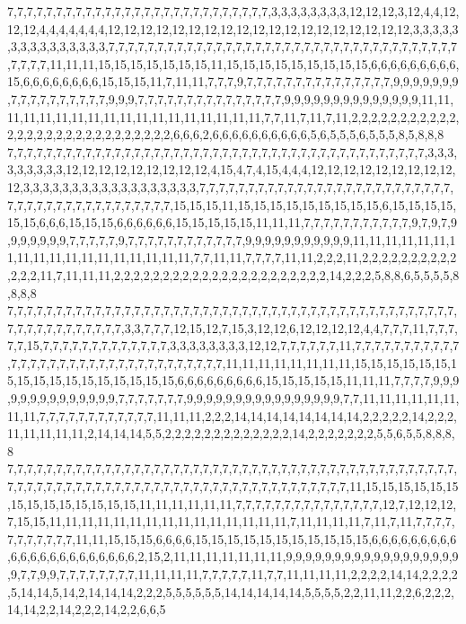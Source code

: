 7,7,7,7,7,7,7,7,7,7,7,7,7,7,7,7,7,7,7,7,7,7,7,7,7,7,7,3,3,3,3,3,3,3,3,12,12,12,3,12,4,4,12,12,12,4,4,4,4,4,4,4,12,12,12,12,12,12,12,12,12,12,12,12,12,12,12,12,12,12,12,3,3,3,3,3,3,3,3,3,3,3,3,3,3,3,7,7,7,7,7,7,7,7,7,7,7,7,7,7,7,7,7,7,7,7,7,7,7,7,7,7,7,7,7,7,7,7,7,7,7,7,7,7,7,7,11,11,11,15,15,15,15,15,15,15,11,15,15,15,15,15,15,15,15,15,6,6,6,6,6,6,6,6,6,15,6,6,6,6,6,6,6,6,15,15,15,11,7,11,11,7,7,7,9,7,7,7,7,7,7,7,7,7,7,7,7,7,7,7,9,9,9,9,9,9,9,7,7,7,7,7,7,7,7,7,7,9,9,9,7,7,7,7,7,7,7,7,7,7,7,7,7,7,7,9,9,9,9,9,9,9,9,9,9,9,9,9,9,11,11,11,11,11,11,11,11,11,11,11,11,11,11,11,11,11,11,7,7,11,7,11,7,11,2,2,2,2,2,2,2,2,2,2,2,2,2,2,2,2,2,2,2,2,2,2,2,2,2,2,2,2,6,6,6,2,6,6,6,6,6,6,6,6,6,6,5,6,5,5,5,6,5,5,5,8,5,8,8,8
7,7,7,7,7,7,7,7,7,7,7,7,7,7,7,7,7,7,7,7,7,7,7,7,7,7,7,7,7,7,7,7,7,7,7,7,7,7,7,7,7,7,7,3,3,3,3,3,3,3,3,3,12,12,12,12,12,12,12,12,12,4,15,4,7,4,15,4,4,4,12,12,12,12,12,12,12,12,12,12,3,3,3,3,3,3,3,3,3,3,3,3,3,3,3,3,3,3,7,7,7,7,7,7,7,7,7,7,7,7,7,7,7,7,7,7,7,7,7,7,7,7,7,7,7,7,7,7,7,7,7,7,7,7,7,7,7,7,7,7,7,15,15,15,11,15,15,15,15,15,15,15,15,15,6,15,15,15,15,15,15,6,6,6,15,15,15,6,6,6,6,6,6,15,15,15,15,15,11,11,11,7,7,7,7,7,7,7,7,7,7,7,9,7,9,7,9,9,9,9,9,9,9,7,7,7,7,7,9,7,7,7,7,7,7,7,7,7,7,7,7,9,9,9,9,9,9,9,9,9,9,9,11,11,11,11,11,11,11,11,11,11,11,11,11,11,11,11,11,11,7,7,11,11,7,7,7,7,11,11,2,2,2,11,2,2,2,2,2,2,2,2,2,2,2,2,2,11,7,11,11,11,2,2,2,2,2,2,2,2,2,2,2,2,2,2,2,2,2,2,2,2,2,2,14,2,2,2,5,8,8,6,5,5,5,5,8,8,8,8
7,7,7,7,7,7,7,7,7,7,7,7,7,7,7,7,7,7,7,7,7,7,7,7,7,7,7,7,7,7,7,7,7,7,7,7,7,7,7,7,7,7,7,7,7,7,7,7,7,7,7,7,7,7,7,7,7,7,3,3,7,7,7,12,15,12,7,15,3,12,12,6,12,12,12,12,4,4,7,7,7,11,7,7,7,7,7,15,7,7,7,7,7,7,7,7,7,7,7,7,7,3,3,3,3,3,3,3,3,12,12,7,7,7,7,7,7,11,7,7,7,7,7,7,7,7,7,7,7,7,7,7,7,7,7,7,7,7,7,7,7,7,7,7,7,7,7,7,7,7,7,11,11,11,11,11,11,11,11,15,15,15,15,15,15,15,15,15,15,15,15,15,15,15,15,15,6,6,6,6,6,6,6,6,6,15,15,15,15,15,11,11,11,7,7,7,7,9,9,9,9,9,9,9,9,9,9,9,9,9,9,7,7,7,7,7,7,7,9,9,9,9,9,9,9,9,9,9,9,9,9,9,9,9,7,7,11,11,11,11,11,11,11,11,7,7,7,7,7,7,7,7,7,7,7,7,11,11,11,2,2,2,14,14,14,14,14,14,14,14,2,2,2,2,2,14,2,2,2,11,11,11,11,11,2,14,14,14,5,5,2,2,2,2,2,2,2,2,2,2,2,2,2,14,2,2,2,2,2,2,2,5,5,6,5,5,8,8,8,8
7,7,7,7,7,7,7,7,7,7,7,7,7,7,7,7,7,7,7,7,7,7,7,7,7,7,7,7,7,7,7,7,7,7,7,7,7,7,7,7,7,7,7,7,7,7,7,7,7,7,7,7,7,7,7,7,7,7,7,7,7,7,7,7,7,7,7,7,7,7,7,7,7,7,7,7,7,7,7,7,7,11,15,15,15,15,15,15,15,15,15,15,15,15,15,15,11,11,11,11,11,11,7,7,7,7,7,7,7,7,7,7,7,7,7,7,7,12,7,12,12,12,7,15,15,11,11,11,11,11,11,11,11,11,11,11,11,11,11,11,7,11,11,11,11,7,11,7,11,7,7,7,7,7,7,7,7,7,7,7,11,11,15,15,15,6,6,6,6,15,15,15,15,15,15,15,15,15,15,15,6,6,6,6,6,6,6,6,6,6,6,6,6,6,6,6,6,6,6,6,6,6,2,15,2,11,11,11,11,11,11,11,9,9,9,9,9,9,9,9,9,9,9,9,9,9,9,9,9,9,9,7,7,9,9,7,7,7,7,7,7,7,7,11,11,11,11,7,7,7,7,7,11,7,7,11,11,11,11,2,2,2,2,14,14,2,2,2,2,5,14,14,5,14,2,14,14,14,2,2,2,5,5,5,5,5,5,14,14,14,14,14,5,5,5,5,2,2,11,11,2,2,6,2,2,2,14,14,2,2,14,2,2,2,14,2,2,6,6,5
